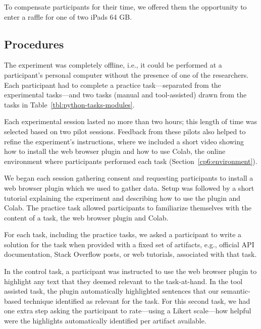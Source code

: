 To compensate participants for their time, we offered them the opportunity to enter a raffle for one of two iPads 64 GB.






\subsection{Procedures}
\label{cp6:evaluation-procedures}



The experiment was completely offline, i.e., it could be performed at a participant's personal computer
without the presence of one of the researchers. Each participant had to complete a practice task---separated from the experimental tasks---and two tasks (manual and tool-assisted) drawn from the tasks in Table~\ref{tbl:python-tasks-modules}. 


Each experimental session lasted no more than two hours; this length of time was selected based on two pilot sessions. 
Feedback from these pilots also helped to refine the experiment's instructions, where we included a short video showing how to install the web browser plugin and how to use Colab, the online environment where participants performed each task (Section~\ref{cp6:environment}).






We began each session gathering consent and requesting participants to install a web browser plugin which we used to gather data.
Setup was followed by a short tutorial explaining the experiment and describing how to use the plugin and Colab. 
The practice task allowed participants to familiarize themselves with the content of a task, the web browser plugin and Colab. 



For each task, including the practice tasks, we asked a participant to write a solution for the task
when provided with a fixed set of artifacts, e.g., official API documentation, Stack Overflow posts, or web tutorials, 
associated with that task.  


In the control task, a participant was instructed to use the web browser plugin to highlight any text that they deemed relevant to the task-at-hand. 
In the tool assisted task, the plugin automatically highlighted sentences that our semantic-based technique identified as relevant for the task. 
For this second task, we had one extra step asking the participant to rate---using a Likert scale---how helpful were the highlights automatically identified per artifact available. 


